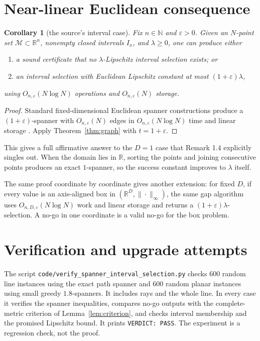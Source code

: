 \documentclass[11pt]{article}
\newtheorem{corollary}{Corollary}
\newcommand{\R}{\mathbb R}
\newcommand{\M}{\mathcal M}
\begin{document}
\section{Near-linear Euclidean consequence}

\begin{corollary}[the source's interval case]\label{cor:euclidean}
Fix $n\in\mathbb N$ and $\varepsilon>0$. Given an $N$-point set
$\M\subset\R^n$, nonempty closed intervals $I_x$, and $\lambda\ge0$, one can
produce either

\begin{enumerate}[label=(\roman*)]
\item a sound certificate that no $\lambda$-Lipschitz interval selection
exists; or
\item an interval selection with Euclidean Lipschitz constant at most
$(1+\varepsilon)\lambda$,
\end{enumerate}

using $O_{n,\varepsilon}(N\log N)$ operations and $O_{n,\varepsilon}(N)$
storage.
\end{corollary}

\begin{proof}
Standard fixed-dimensional Euclidean spanner constructions produce a
$(1+\varepsilon)$-spanner with $O_{n,\varepsilon}(N)$ edges in
$O_{n,\varepsilon}(N\log N)$ time and linear storage
\cite{AryaEtAl}. Apply Theorem~\ref{thm:graph} with
$t=1+\varepsilon$.
\end{proof}

This gives a full affirmative answer to the $D=1$ case that Remark 1.4
explicitly singles out. When the domain lies in $\R$, sorting the points and
joining consecutive points produces an exact $1$-spanner, so the success
constant improves to $\lambda$ itself.

The same proof coordinate by coordinate gives another extension: for fixed
$D$, if every value is an axis-aligned box in $(\R^D,\|\cdot\|_\infty)$, the
same gap algorithm uses $O_{n,D,\varepsilon}(N\log N)$ work and linear storage
and returns a $(1+\varepsilon)\lambda$-selection. A no-go in one coordinate is
a valid no-go for the box problem.

\section{Verification and upgrade attempts}

The script
\texttt{code/verify\_spanner\_interval\_selection.py} checks 600 random line
instances using the exact path spanner and 600 random planar instances using
small greedy $1.8$-spanners. It includes rays and the whole line. In every
case it verifies the spanner inequalities, compares no-go outputs with the
complete-metric criterion of Lemma~\ref{lem:criterion}, and checks interval
membership and the promised Lipschitz bound. It prints
\texttt{VERDICT: PASS}. The experiment is a regression check, not the proof.
\end{document}
